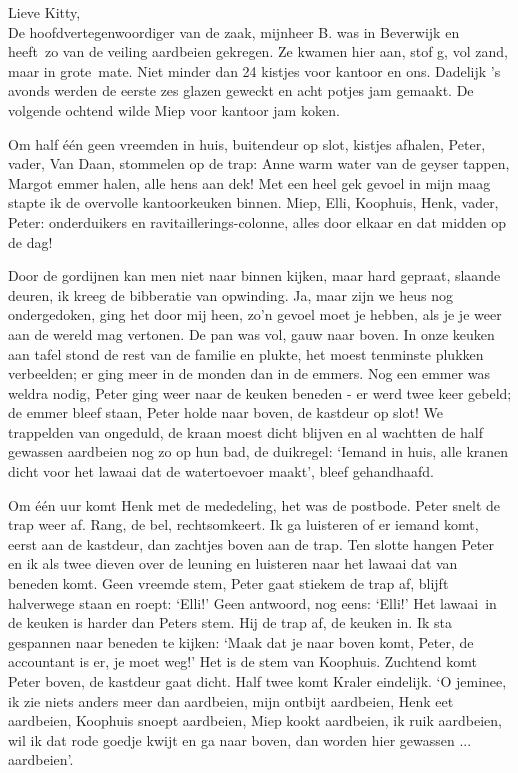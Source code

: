 \documentclass{book}
\begin{document}
Lieve Kitty,\\De hoofdvertegenwoordiger van de zaak, mijnheer B. was in
Beverwijk en heeft~zo van de veiling aardbeien gekregen. Ze kwamen hier
aan, stof g, vol zand, maar in grote~mate. Niet minder dan 24 kistjes
voor kantoor en ons. Dadelijk 's avonds werden de eerste zes glazen
geweckt en acht potjes jam gemaakt. De volgende ochtend wilde Miep voor
kantoor jam koken.

Om half één geen vreemden in huis, buitendeur op slot, kistjes afhalen,
Peter, vader, Van Daan, stommelen op de trap: Anne warm water van de
geyser tappen, Margot emmer halen, alle hens aan dek! Met een heel gek
gevoel in mijn maag stapte ik de overvolle kantoorkeuken binnen. Miep,
Elli, Koophuis, Henk, vader, Peter: onderduikers en
ravitaillerings-colonne, alles door elkaar en dat midden op de dag!

Door de gordijnen kan men niet naar binnen kijken, maar hard gepraat,
slaande deuren, ik kreeg de bibberatie van opwinding. Ja, maar zijn we
heus nog ondergedoken, ging het door mij heen, zo'n gevoel moet je
hebben, als je je weer aan de wereld mag vertonen. De pan was vol, gauw
naar boven. In onze keuken aan tafel stond de rest van de familie en
plukte, het moest tenminste plukken verbeelden; er ging meer in de
monden dan in de emmers. Nog een emmer was weldra nodig, Peter ging weer
naar de keuken beneden - er werd twee keer gebeld; de emmer bleef staan,
Peter holde naar boven, de kastdeur op slot! We trappelden van ongeduld,
de kraan moest dicht blijven en al wachtten de half gewassen aardbeien
nog zo op hun bad, de duikregel: `Iemand in huis, alle kranen dicht voor
het lawaai dat de watertoevoer maakt', bleef gehandhaafd.

Om één uur komt Henk met de mededeling, het was de postbode. Peter snelt
de trap weer af. Rang, de bel, rechtsomkeert. Ik ga luisteren of er
iemand komt, eerst aan de kastdeur, dan zachtjes boven aan de trap. Ten
slotte hangen Peter en ik als twee dieven over de leuning en luisteren
naar het lawaai dat van beneden komt. Geen vreemde stem, Peter gaat
stiekem de trap af, blijft halverwege staan en roept: `Elli!' Geen
antwoord, nog eens: `Elli!' Het lawaai~in de keuken is harder dan Peters
stem. Hij de trap af, de keuken in. Ik sta gespannen naar beneden te
kijken: `Maak dat je naar boven komt, Peter, de accountant is er, je
moet weg!' Het is de stem van Koophuis. Zuchtend komt Peter boven, de
kastdeur gaat dicht. Half twee komt Kraler eindelijk. `O jeminee, ik zie
niets anders meer dan aardbeien, mijn ontbijt aardbeien, Henk eet
aardbeien, Koophuis snoept aardbeien, Miep kookt aardbeien, ik ruik
aardbeien, wil ik dat rode goedje kwijt en ga naar boven, dan worden
hier gewassen ... aardbeien'.
\end{document}
